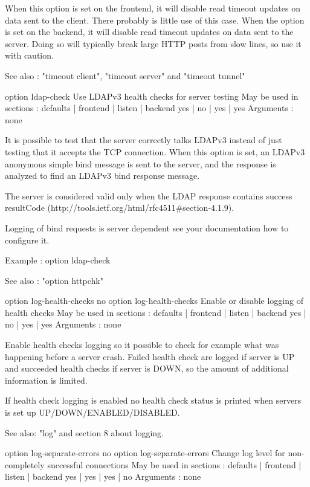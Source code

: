   When this option is set on the frontend, it will disable read timeout updates
  on data sent to the client. There probably is little use of this case. When
  the option is set on the backend, it will disable read timeout updates on
  data sent to the server. Doing so will typically break large HTTP posts from
  slow lines, so use it with caution.

  See also : "timeout client", "timeout server" and "timeout tunnel"


option ldap-check
  Use LDAPv3 health checks for server testing
  May be used in sections :   defaults | frontend | listen | backend
                                 yes   |    no    |   yes  |   yes
  Arguments : none

  It is possible to test that the server correctly talks LDAPv3 instead of just
  testing that it accepts the TCP connection. When this option is set, an
  LDAPv3 anonymous simple bind message is sent to the server, and the response
  is analyzed to find an LDAPv3 bind response message.

  The server is considered valid only when the LDAP response contains success
  resultCode (http://tools.ietf.org/html/rfc4511#section-4.1.9).

  Logging of bind requests is server dependent see your documentation how to
  configure it.

  Example :
        option ldap-check

  See also : "option httpchk"


option log-health-checks
no option log-health-checks
  Enable or disable logging of health checks
  May be used in sections :   defaults | frontend | listen | backend
                                 yes   |    no    |   yes  |  yes
  Arguments : none

  Enable health checks logging so it possible to check for example what
  was happening before a server crash. Failed health check are logged if
  server is UP and succeeded health checks if server is DOWN, so the amount
  of additional information is limited.

  If health check logging is enabled no health check status is printed
  when servers is set up UP/DOWN/ENABLED/DISABLED.

  See also: "log" and section 8 about logging.


option log-separate-errors
no option log-separate-errors
  Change log level for non-completely successful connections
  May be used in sections :   defaults | frontend | listen | backend
                                 yes   |    yes   |   yes  |   no
  Arguments : none

